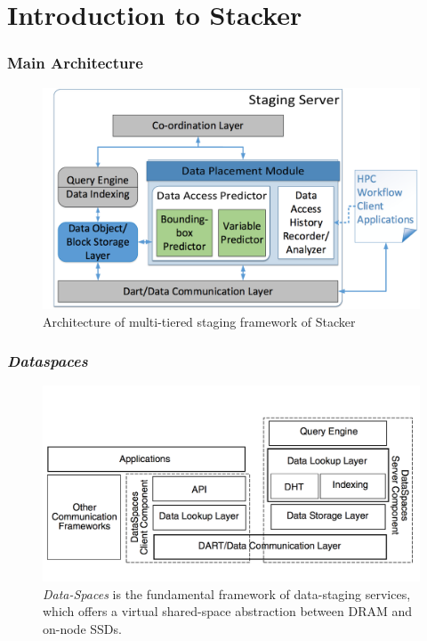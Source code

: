 \documentclass{beamer}
\begin{document}
\section{Introduction to Stacker}
\begin{frame}
\frametitle{Main Architecture}
\begin{figure}
        \includegraphics[width=\linewidth]{images/stacker_fig_2.png}
        \caption{Architecture of multi-tiered staging framework of Stacker}
\end{figure}
\end{frame}
\begin{frame}
\frametitle{\textit{Dataspaces}}
\begin{figure}
\includegraphics[width=\textwidth]{images/dataspaces.png}
\caption{\textit{Data-Spaces} is the fundamental framework of data-staging services, which offers a virtual shared-space abstraction between DRAM and on-node SSDs.}
\end{figure}
\end{frame}
\end{document}
